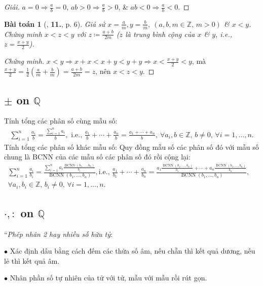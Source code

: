 \documentclass{article}
\numberwithin{equation}{section}
\newtheorem{baitoan}{Bài toán}[section]
\begin{document}
\begin{proof}[Giải]
	$a = 0\Rightarrow\frac{a}{b} = 0$, $ab > 0\Rightarrow\frac{a}{b} > 0$, \& $ab < 0\Rightarrow\frac{a}{b} < 0$.
\end{proof}

\begin{baitoan}[\cite{Trong_Toan_7_2022}, \textbf{11.}, p. 6]
	Giả sử $x = \frac{a}{m},y = \frac{b}{m},\ (a,b,m\in\mathbb{Z},\,m > 0)$ \& $x < y$. Chứng minh $x < z < y$ với $z\coloneqq\frac{a + b}{2m}$ ($z$ là \emph{trung bình cộng} của $x$ \& $y$, i.e., $z = \frac{x + y}{2}$).
\end{baitoan}

\begin{proof}[Chứng minh]
	$x < y\Rightarrow x + x < x + y < y + y\Rightarrow x < \frac{x + y}{2} < y$, mà $\frac{x + y}{2} = \frac{1}{2}\left(\frac{a}{m} + \frac{b}{m}\right) = \frac{a + b}{2m} = z$, nên $x < z < y$.
\end{proof}


\subsection{$\pm$ on $\mathbb{Q}$}
Tính tổng các phân số cùng mẫu số:
\begin{align*}
	\sum_{i=1}^{n} \frac{a_i}{b} = \frac{\sum_{i=1}^n a_i}{b},\mbox{ i.e., } \frac{a_1}{b} + \cdots + \frac{a_n}{b} = \frac{a_1 + \cdots + a_n}{b},\ \forall a_i,b\in\mathbb{Z},\,b\ne 0,\,\forall i = 1,\ldots,n.
\end{align*}
Tính tổng các phân số khác mẫu số: Quy đồng mẫu số các phân số đó với mẫu số chung là BCNN của các mẫu số các phân số đó rồi cộng lại:
\begin{align*}
	\sum_{i=1}^{n} \frac{a_i}{b_i} = \frac{\sum_{i=1}^n a_i\frac{\operatorname{BCNN}(b_1,\ldots,b_n)}{b_i}}{\operatorname{BCNN}(b_1,\ldots,b_n)},\mbox{i.e., }\frac{a_1}{b_1} + \cdots + \frac{a_n}{b_n} = \frac{a_1\frac{\operatorname{BCNN}(b_1,\ldots,b_n)}{b_1} + \cdots + a_n\frac{\operatorname{BCNN}(b_1,\ldots,b_n)}{b_n}}{\operatorname{BCNN}(b_1,\ldots,b_n)},&\\\forall a_i,b_i\in\mathbb{Z},\,b_i\ne 0,\,\forall i = 1,\ldots,n.&
\end{align*}


\subsection{$\cdot,:$ on $\mathbb{Q}$}
``\textit{Phép nhân 2 hay nhiều số hữu tỷ}:
\begin{enumerate*}
	\item[$\bullet$] Xác định dấu bằng cách đếm các thừa số âm, nếu chẵn thì kết quả dương, nếu lẻ thì kết quả âm.
	\item[$\bullet$] Nhân phần số tự nhiên của tử với tử, mẫu với mẫu rồi rút gọn.
\end{enumerate*}
\end{document}
